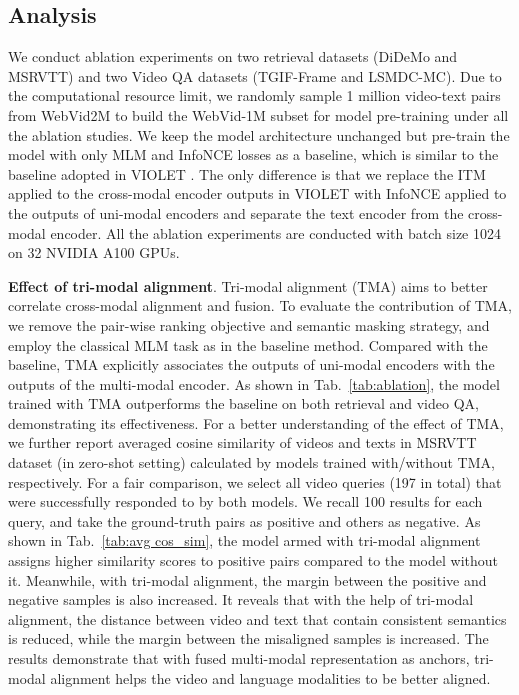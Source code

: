 \documentclass[10pt,twocolumn,letterpaper]{article}
\begin{document}
{\subsection{Analysis}
We conduct ablation experiments on two retrieval datasets (DiDeMo and MSRVTT) and two Video QA datasets (TGIF-Frame and LSMDC-MC). Due to the computational resource limit, we randomly sample 1 million video-text pairs  from WebVid2M \cite{bain2021frozen}    to build the WebVid-1M subset  for model pre-training under   all the ablation studies. We keep the model architecture unchanged but pre-train the model with only MLM and InfoNCE losses as a baseline, which  is similar to the baseline adopted in VIOLET \cite{fu2021violet}. The only difference is that we replace the ITM applied to the cross-modal encoder outputs in VIOLET \cite{fu2021violet} with InfoNCE applied to the outputs of uni-modal encoders and separate the text encoder from the cross-modal encoder. All the ablation experiments are conducted with batch size 1024 on 32 NVIDIA A100 GPUs.









\noindent  \textbf{Effect of tri-modal alignment}. Tri-modal alignment (TMA) aims to better correlate cross-modal alignment and   fusion. To evaluate the contribution of TMA, we remove the pair-wise ranking objective and semantic masking strategy, and employ the classical MLM task as in the baseline method. Compared with the baseline, TMA explicitly associates the outputs of uni-modal encoders with the outputs of the multi-modal encoder. As shown in Tab.~\ref{tab:ablation}, the model trained with TMA outperforms the baseline on both retrieval and video QA, demonstrating its effectiveness. For a better understanding of the effect of TMA, we further report averaged cosine similarity of videos and texts in MSRVTT dataset (in zero-shot setting) calculated by models trained with/without TMA, respectively.  For a fair comparison, we select all video queries (197 in total) that were successfully responded to by both models. We recall 100 results for each query, and take the ground-truth pairs as positive and others as negative. 
As shown in  Tab.~\ref{tab:avg cos_sim}, the model armed with tri-modal alignment assigns higher similarity scores to positive pairs compared to the model without it. Meanwhile, with  tri-modal alignment, the margin between the positive and negative samples is also increased. It reveals that with the help of tri-modal alignment, the distance between video and text that contain consistent semantics is  reduced, while the margin between the misaligned samples is increased. The results demonstrate that with fused multi-modal representation as anchors, tri-modal alignment helps the video and language modalities to be better aligned.

}
\end{document}
